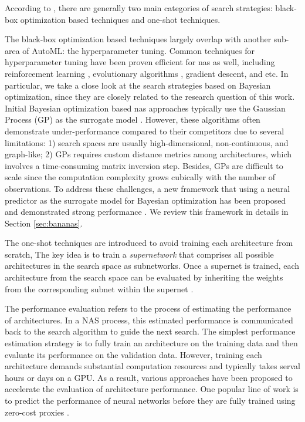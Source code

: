 \begin{description}[leftmargin=0cm, listparindent=\parindent]
	\item [Search Strategy] According to \cite{white2023survey}, there are generally two main categories of search strategies: black-box optimization based techniques and one-shot techniques. 
	 
		The black-box optimization based techniques largely overlap with another sub-area of AutoML: the hyperparameter tuning. Common techniques for hyperparameter tuning have been proven efficient for \gls{nas} as well, including reinforcement learning \cite{zoph2017neural, zoph2018learning}, evolutionary algorithms \cite{maziarz2018evo-nas,  real2019regularized}, gradient descent\cite{liu2018darts}, and etc. In particular, we take a close look at the search strategies based on Bayesian optimization, since they are closely related to the research question of this work. Initial Bayesian optimization based \gls{nas} approaches typically use the Gaussian Process (GP) as the surrogate model \cite{kandasamy2018neural}. However, these algorithms often demonstrate under-performance compared to their competitors due to several limitations: 1) search spaces are usually high-dimensional, non-continuous, and graph-like; 2) GPs requires custom distance metrics among architectures, which involves a time-consuming matrix inversion step. Besides, GPs are difficult to scale since the computation complexity grows cubically with the number of observations. To address these challenges, a new framework that using a neural predictor as the surrogate model for Bayesian optimization has been proposed and demonstrated strong performance \cite{ma2019deep, springenberg2016bayesian, white2019bananas}. We review this framework in details in Section \ref{sec:bananas}.
		
		The one-shot techniques are introduced to avoid training each architecture from scratch, The key idea is to train a \textit{supernetwork} that comprises all possible architectures in the search space as subnetworks. Once a supernet is trained, each architecture from the search space can be evaluated by inheriting the weights from the corresponding subnet within the supernet \cite{pmlr-v80-bender18a, liu2018darts}.
		
	\item [Performance Evaluation] The performance evaluation refers to the process of estimating the performance of architectures. In a NAS process, this estimated performance is communicated back to the search algorithm to guide the next search. The simplest performance estimation strategy is to fully train an architecture on the training data and then evaluate its performance on the validation data. However, training each architecture demands substantial computation resources and typically takes serval hours or days on a GPU. As a result, various approaches have been proposed to accelerate the evaluation of architecture performance. One popular line of work is to  predict the performance of neural networks before they are fully trained using zero-cost proxies \cite{pmlr-v139-mellor21a}.
	

\end{description}
